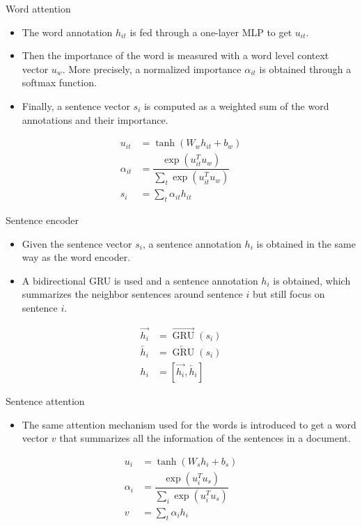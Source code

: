\documentclass[10pt]{beamer}
\begin{document}
\begin{frame}{Word attention}

\begin{itemize}
\item
The word annotation $h_{it}$ is fed through a one-layer MLP to get $u_{it}$.
\item
Then the importance of the word is measured with a word level context vector $u_w$. More precisely, a normalized importance $\alpha_{it}$ is obtained through a softmax function.
\item
Finally, a sentence vector $s_i$ is computed as a weighted sum of the word annotations and their importance.\\
\end{itemize}
\begin{align*}
u_{it} &= \tanh\left(W_wh_{it}+b_w\right) \\
\alpha_{it} &= \dfrac{\exp\left(u_{it}^Tu_{w}\right)}{\sum_t\exp\left(u_{it}^Tu_w\right)} \\
s_i &= \sum_t\alpha_{it}h_{it}
\end{align*}

\end{frame}


\begin{frame}{Sentence encoder}

\begin{itemize}
\item
Given the sentence vector $s_i$, a sentence annotation $h_i$ is obtained in the same way as the word encoder.
\item
A bidirectional GRU is used and a sentence annotation $h_i$ is obtained, which summarizes the neighbor sentences around sentence $i$ but still focus on sentence $i$.\\
\end{itemize}
\begin{align*}
\overrightarrow{h_{i}} &= \overrightarrow{\operatorname{GRU}}(s_{i}) \\
\overleftarrow{h_{i}} &= \overleftarrow{\operatorname{GRU}}(s_{i}) \\
h_{i} &= [\overrightarrow{h_{i}}, \overleftarrow{h_{i}}]
\end{align*}

\end{frame}


\begin{frame}{Sentence attention}

\begin{itemize}
\item
The same attention mechanism used for the words is introduced to get a word vector $v$ that summarizes all the information of the sentences in a document.\\
\end{itemize}
\begin{align*}
u_{i} &= \tanh\left(W_sh_i+b_s\right) \\
\alpha_{i} &= \dfrac{\exp\left(u_{i}^Tu_s\right)}{\sum_i\exp\left(u_i^Tu_s\right)} \\
v &= \sum_t\alpha_{i}h_{i}
\end{align*}

\end{frame}
\end{document}

